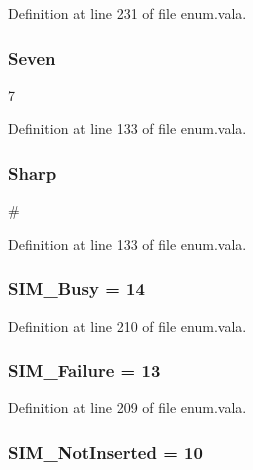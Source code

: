 Definition at line 231 of file enum.\-vala.

\hypertarget{enum_8vala_a664c9d9eff9f8aedc5d91b3bc6625968}{
\subsubsection[{Seven}]{\setlength{\rightskip}{0pt plus 5cm}Seven}}\label{enum_8vala_a664c9d9eff9f8aedc5d91b3bc6625968}
7 

Definition at line 133 of file enum.\-vala.

\hypertarget{enum_8vala_a2c88735882fca7962e70190bc67e5514}{
\subsubsection[{Sharp}]{\setlength{\rightskip}{0pt plus 5cm}Sharp}}\label{enum_8vala_a2c88735882fca7962e70190bc67e5514}
\# 

Definition at line 133 of file enum.\-vala.

\hypertarget{enum_8vala_abf2032fefc96dc683f80703ccc2a504d}{
\subsubsection[{S\-I\-M\-\_\-\-Busy}]{\setlength{\rightskip}{0pt plus 5cm}S\-I\-M\-\_\-\-Busy = 14}}\label{enum_8vala_abf2032fefc96dc683f80703ccc2a504d}


Definition at line 210 of file enum.\-vala.

\hypertarget{enum_8vala_a6273256017f3c0a00bdae335404c766f}{
\subsubsection[{S\-I\-M\-\_\-\-Failure}]{\setlength{\rightskip}{0pt plus 5cm}S\-I\-M\-\_\-\-Failure = 13}}\label{enum_8vala_a6273256017f3c0a00bdae335404c766f}


Definition at line 209 of file enum.\-vala.

\hypertarget{enum_8vala_aa983269142921e1131672202497b42fa}{
\subsubsection[{S\-I\-M\-\_\-\-Not\-Inserted}]{\setlength{\rightskip}{0pt plus 5cm}S\-I\-M\-\_\-\-Not\-Inserted = 10}}\label{enum_8vala_aa983269142921e1131672202497b42fa}


